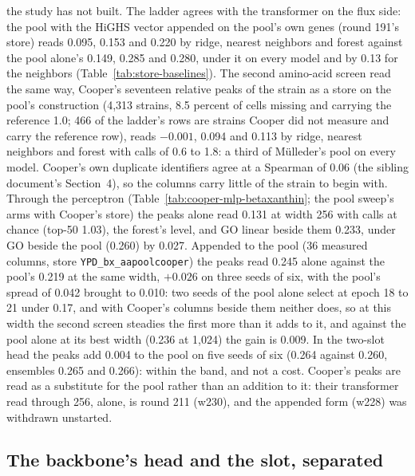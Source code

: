 the study has not built. The ladder agrees with the transformer on the flux side: the pool
with the HiGHS vector appended on the pool's own genes (round 191's store) reads 0.095,
0.153 and 0.220 by ridge, nearest neighbors and forest against the pool alone's 0.149,
0.285 and 0.280, under it on every model and by 0.13 for the neighbors
(Table~\ref{tab:store-baselines}). The second amino-acid screen read the same way,
Cooper's seventeen relative peaks of the strain as a store on the pool's construction
(4,313 strains, 8.5 percent of cells missing and carrying the reference 1.0; 466 of
the ladder's rows are strains Cooper did not measure and carry the reference row),
reads $-0.001$, 0.094 and 0.113 by ridge, nearest neighbors and forest with calls of
0.6 to 1.8: a third of M\"ulleder's pool on every model. Cooper's own duplicate
identifiers agree at a Spearman of 0.06 (the sibling document's Section~4), so the
columns carry little of the strain to begin with. Through the perceptron
(Table~\ref{tab:cooper-mlp-betaxanthin}; the pool sweep's arms with Cooper's store)
the peaks alone read 0.131 at width 256 with calls at chance (top-50 1.03), the
forest's level, and GO linear beside them 0.233, under GO beside the pool (0.260) by
0.027. Appended to the pool (36 measured columns, store
\texttt{YPD\_bx\_aapoolcooper}) the peaks read 0.245 alone against the pool's 0.219
at the same width, $+0.026$ on three seeds of six, with the pool's spread of 0.042
brought to 0.010: two seeds of the pool alone select at epoch 18 to 21 under 0.17, and
with Cooper's columns beside them neither does, so at this width the second screen
steadies the first more than it adds to it, and against the pool alone at its best
width (0.236 at 1,024) the gain is 0.009. In the two-slot head the peaks add 0.004 to
the pool on five seeds of six (0.264 against 0.260, ensembles 0.265 and 0.266): within
the band, and not a cost. Cooper's peaks are read as a substitute for the pool rather
than an addition to it: their transformer read through 256, alone, is round 211
(w230), and the appended form (w228) was withdrawn unstarted.





\subsection{The backbone's head and the slot, separated}
\label{sec:decomposition}

